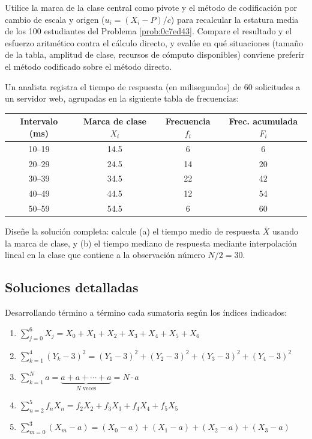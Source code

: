 \begin{problema}
	\label{prob:ced3c3b}
	Utilice la marca de la clase central como pivote y el método de codificación por cambio de escala y origen ($u_i = (X_i-P)/c$) para recalcular la estatura media de los 100 estudiantes del Problema \ref{prob:0c7ed43}. Compare el resultado y el esfuerzo aritmético contra el cálculo directo, y evalúe en qué situaciones (tamaño de la tabla, amplitud de clase, recursos de cómputo disponibles) conviene preferir el método codificado sobre el método directo.
\end{problema}

\begin{problema}
	\label{prob:32476e7}
	Un analista registra el tiempo de respuesta (en milisegundos) de 60 solicitudes a un servidor web, agrupadas en la siguiente tabla de frecuencias:
	\begin{center}
		\begin{tabular}{cccc}
			\hline
			Intervalo (ms) & Marca de clase $X_i$ & Frecuencia $f_i$ & Frec. acumulada $F_i$ \\
			\hline
			10--19 & 14.5 & 6  & 6 \\
			20--29 & 24.5 & 14 & 20 \\
			30--39 & 34.5 & 22 & 42 \\
			40--49 & 44.5 & 12 & 54 \\
			50--59 & 54.5 & 6  & 60 \\
			\hline
		\end{tabular}
	\end{center}
	Diseñe la solución completa: calcule (a) el tiempo medio de respuesta $\bar{X}$ usando la marca de clase, y (b) el tiempo mediano de respuesta mediante interpolación lineal en la clase que contiene a la observación número $N/2=30$.
\end{problema}

\subsection*{Soluciones detalladas}

\begin{solproblema}
	Desarrollando término a término cada sumatoria según los índices indicados:
	\begin{enumerate}
		\item $\displaystyle\sum_{j=0}^{6}X_{j} = X_{0} + X_{1} + X_{2} + X_{3} + X_{4} + X_{5} + X_{6}$
		\item $\displaystyle\sum_{k=1}^{4}\left( Y_{k}-3 \right)^{2} = (Y_{1}-3)^{2} + (Y_{2}-3)^{2} + (Y_{3}-3)^{2} + (Y_{4}-3)^{2}$
		\item $\displaystyle\sum_{k=1}^{N}a = \underbrace{a + a + \cdots + a}_{N \text{ veces}} = N \cdot a$
		\item $\displaystyle\sum_{n=2}^{5}{f_{n}}X_{n} = f_{2}X_{2} + f_{3}X_{3} + f_{4}X_{4} + f_{5}X_{5}$
		\item $\displaystyle\sum_{m=0}^{3}\left( X_{m}-a \right) = (X_{0}-a) + (X_{1}-a) + (X_{2}-a) + (X_{3}-a)$
	\end{enumerate}
\end{solproblema}

